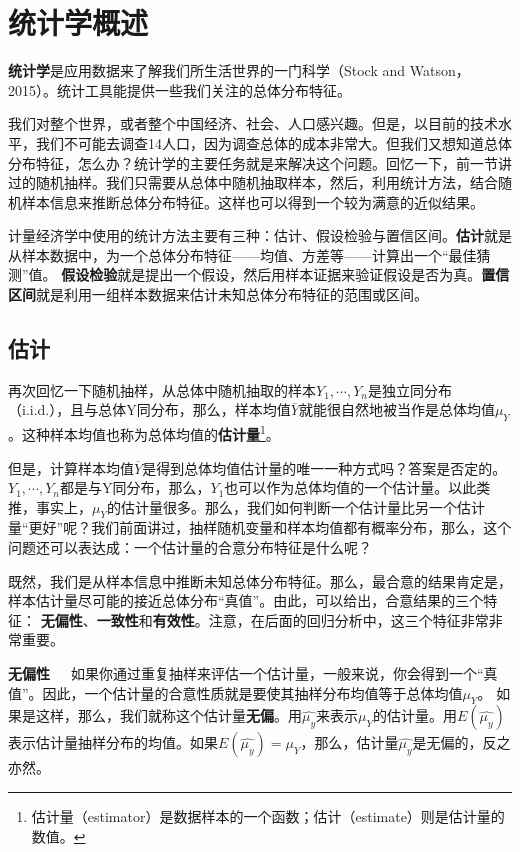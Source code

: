 \documentclass[cn,12pt,math=newtx,citestyle=gb7714-2015,bibstyle=gb7714-2015]{elegantbook}
\begin{document}
	
	\section{统计学概述}
	\textbf{统计学}是应用数据来了解我们所生活世界的一门科学（Stock and Watson，2015）。统计工具能提供一些我们关注的总体分布特征。
	
	我们对整个世界，或者整个中国经济、社会、人口感兴趣。但是，以目前的技术水平，我们不可能去调查14人口，因为调查总体的成本非常大。但我们又想知道总体分布特征，怎么办？统计学的主要任务就是来解决这个问题。回忆一下，前一节讲过的随机抽样。我们只需要从总体中随机抽取样本，然后，利用统计方法，结合随机样本信息来推断总体分布特征。这样也可以得到一个较为满意的近似结果。
	
	计量经济学中使用的统计方法主要有三种：估计、假设检验与置信区间。\textbf{估计}就是从样本数据中，为一个总体分布特征——均值、方差等——计算出一个“最佳猜测”值。
	\textbf{假设检验}就是提出一个假设，然后用样本证据来验证假设是否为真。\textbf{置信区间}就是利用一组样本数据来估计未知总体分布特征的范围或区间。
	
	\subsection{估计}
	再次回忆一下随机抽样，从总体中随机抽取的样本$Y_1,\cdots,Y_n$是独立同分布（i.i.d.），且与总体Y同分布，那么，样本均值$\overline{Y}$就能很自然地被当作是总体均值$\mu_Y$。这种样本均值也称为总体均值的\textbf{估计量}\footnote{估计量（estimator）是数据样本的一个函数；估计（estimate）则是估计量的数值。}。
	
	但是，计算样本均值$\overline{Y}$是得到总体均值估计量的唯一一种方式吗？答案是否定的。$Y_1,\cdots,Y_n$都是与Y同分布，那么，$Y_1$也可以作为总体均值的一个估计量。以此类推，事实上，$\mu_Y$的估计量很多。那么，我们如何判断一个估计量比另一个估计量“更好”呢？我们前面讲过，抽样随机变量和样本均值都有概率分布，那么，这个问题还可以表达成：一个估计量的合意分布特征是什么呢？
	
	既然，我们是从样本信息中推断未知总体分布特征。那么，最合意的结果肯定是，样本估计量尽可能的接近总体分布“真值”。由此，可以给出，合意结果的三个特征：
	\textbf{无偏性}、\textbf{一致性}和\textbf{有效性}。注意，在后面的回归分析中，这三个特征非常非常重要。
	
	\textbf{无偏性}~~~如果你通过重复抽样来评估一个估计量，一般来说，你会得到一个“真值”。因此，一个估计量的合意性质就是要使其抽样分布均值等于总体均值$\mu_Y$。 如果是这样，那么，我们就称这个估计量\textbf{无偏}。用$\hat{\mu_y}$来表示$\mu_Y$的估计量。用$E(\hat{\mu_y})$表示估计量抽样分布的均值。如果$E(\hat{\mu_y})=\mu_Y$，那么，估计量$\hat{\mu_y}$是无偏的，反之亦然。
	
\end{document}
